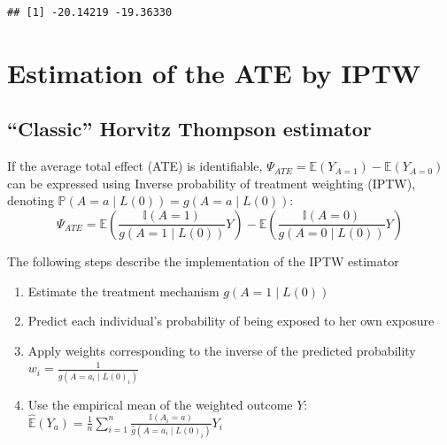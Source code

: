 \documentclass[
]{book}
\begin{document}
\begin{verbatim}
## [1] -20.14219 -19.36330
\end{verbatim}

\section{Estimation of the ATE by IPTW}\label{estimation-of-the-ate-by-iptw}

\subsection{``Classic'' Horvitz Thompson estimator}\label{classic-horvitz-thompson-estimator}

If the average total effect (ATE) is identifiable, \(\Psi_{ATE} = \mathbb{E}(Y_{A=1}) - \mathbb{E}(Y_{A=0})\) can be expressed using Inverse probability of treatment weighting (IPTW), denoting \(\mathbb{P}(A=a \mid L(0)) = g(A=a \mid L(0))\):
\begin{equation}
\Psi_{ATE} = \mathbb{E}\left( \frac{\mathbb{I}(A=1)}{g(A=1 \mid L(0))} Y \right) - \mathbb{E}\left( \frac{\mathbb{I}(A=0)}{g(A=0 \mid L(0))} Y \right)
\end{equation}

The following steps describe the implementation of the IPTW estimator

\begin{enumerate}
\def\labelenumi{\arabic{enumi}.}
\item
  Estimate the treatment mechanism \(g(A=1 \mid L(0))\)
\item
  Predict each individual's probability of being exposed to her own exposure
\item
  Apply weights corresponding to the inverse of the predicted probability \(w_i = \frac{1}{\hat{g}(A = a_i \mid L(0)_i)}\)
\item
  Use the empirical mean of the weighted outcome \(Y\): \(\hat{\mathbb{E}}(Y_a) = \frac{1}{n} \sum_{i=1}^n \frac{\mathbb{I}(A_i=a)}{\hat{g}(A=a_i \mid L(0)_i)} Y_i\)
\end{enumerate}
\end{document}
